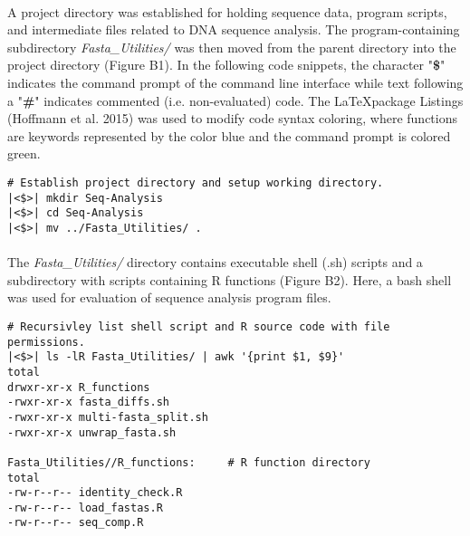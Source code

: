 \paragraph{} A project directory was established for holding sequence data, program scripts, and intermediate files related to DNA sequence analysis.  The program-containing subdirectory \textit{Fasta\_Utilities/} was then moved from the parent directory into the project directory (Figure B1).  In the following code snippets, the character "\textbf{\$}" indicates the command prompt of the command line interface while text following a "\textbf{\#}" indicates commented (i.e. non-evaluated) code.  The \LaTeX package Listings (Hoffmann et al. 2015) was used to modify code syntax coloring, where functions are keywords represented by the color blue and the command prompt is colored green.

\vspace*{36pt}

\begin{lstlisting}[caption={Project directory setup.}]
# Establish project directory and setup working directory.
|<$>| mkdir Seq-Analysis
|<$>| cd Seq-Analysis
|<$>| mv ../Fasta_Utilities/ .  
\end{lstlisting}

\clearpage

\paragraph{} The \textit{Fasta\_Utilities/} directory contains executable shell (.sh) scripts and a subdirectory with scripts containing R functions (Figure B2).  Here, a bash shell was used for evaluation of sequence analysis program files. 

\vspace*{36pt}

\begin{lstlisting}[caption={Contents of \textit{Fasta\_Utilities/} subdirectory.}]
# Recursivley list shell script and R source code with file permissions.
|<$>| ls -lR Fasta_Utilities/ | awk '{print $1, $9}'
total
drwxr-xr-x R_functions
-rwxr-xr-x fasta_diffs.sh
-rwxr-xr-x multi-fasta_split.sh
-rwxr-xr-x unwrap_fasta.sh
 
Fasta_Utilities//R_functions:     # R function directory
total 
-rw-r--r-- identity_check.R
-rw-r--r-- load_fastas.R
-rw-r--r-- seq_comp.R
\end{lstlisting}

\vspace*{36pt}

